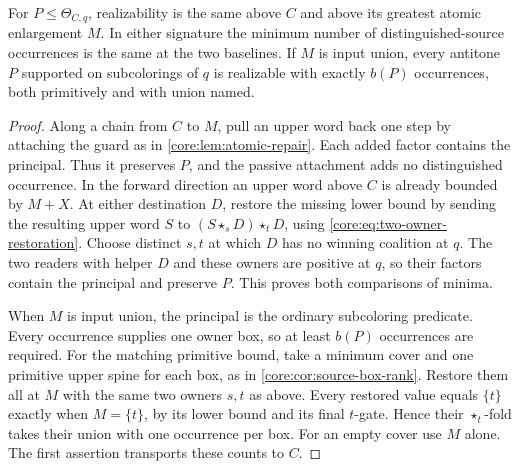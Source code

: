 \begin{corollary}
\label{core:cor:principal-normalization-count}
For $P\leq\Theta_{C,q}$, realizability is the same above $C$ and
above its greatest atomic enlargement $M$. In either signature the
minimum number of distinguished-source occurrences is the same at
the two baselines. If $M$ is input union, every antitone $P$ supported
on subcolorings of $q$ is realizable with exactly $b(P)$ occurrences,
both primitively and with union named.
\end{corollary}
\begin{proof}
Along a chain from $C$ to $M$, pull an upper word back one step by
attaching the guard as in \cref{core:lem:atomic-repair}. Each added
factor contains the principal. Thus it preserves $P$, and the passive
attachment adds no distinguished occurrence. In the forward direction
an upper word above $C$ is already bounded by $M+X$.
At either destination $D$, restore the missing lower bound by sending
the resulting upper word $S$ to $(S\star_s D)\star_t D$, using
\eqref{core:eq:two-owner-restoration}. Choose distinct $s,t$ at which
$D$ has no winning coalition at $q$. The two readers with helper $D$
and these owners are positive at $q$, so their factors contain the
principal and preserve $P$. This proves both comparisons of minima.

When $M$ is input union, the principal is the ordinary subcoloring
predicate. Every occurrence supplies one owner box, so at least
$b(P)$ occurrences are required. For the matching primitive bound,
take a minimum cover and one primitive upper spine for each box,
as in \cref{core:cor:source-box-rank}. Restore them all at $M$
with the same two owners $s,t$ as above. Every restored value equals
$\{t\}$ exactly when $M=\{t\}$, by its lower bound and its final
$t$-gate. Hence their $\star_t$-fold takes their union with one
occurrence per box. For an empty cover use $M$ alone. The first
assertion transports these counts to $C$.
\end{proof}

